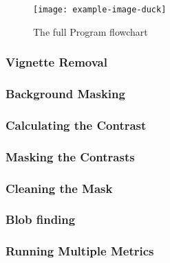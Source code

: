 \begin{figure}[h!]
    \centering
    \texttt{[image: example-image-duck]}
    \caption{The full Program flowchart}
\end{figure}

\subsubsection{Vignette Removal}


\subsubsection{Background Masking}


\subsubsection{Calculating the Contrast}


\subsubsection{Masking the Contrasts}


\subsubsection{Cleaning the Mask}


\subsubsection{Blob finding}


\subsubsection{Running Multiple Metrics}
